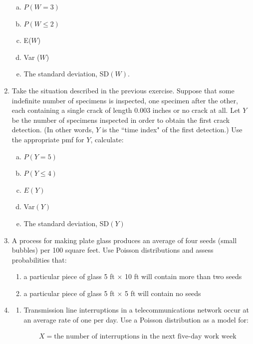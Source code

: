 \documentclass{article}\usepackage{graphicx, color}
\numberwithin{equation}{section}
\begin{document}
\begin{flushleft}
\begin{enumerate}[1. ]
\begin{enumerate}[a. ]
\item $P(W = 3)$
\item $P(W \le 2)$
\item E($W$)
\item Var ($W$)
\item The standard deviation, SD$(W)$.
\end{enumerate}





\item 
Take the situation described in the previous exercise. Suppose that some indefinite number of specimens is inspected, one specimen after the other, each containing a single crack of length 0.003 inches or no crack at all. Let $Y$ be the number of specimens inspected in order to obtain the first crack detection. (In other words, $Y$ is the ``time index" of the first detection.) Use the appropriate pmf for $Y$, calculate:
\begin{enumerate}[a. ]
\item $P(Y = 5)$
\item $P(Y \le 4)$
\item $E(Y)$
\item Var$(Y)$
\item The standard deviation, SD$(Y)$
\end{enumerate}



\item A process for making plate glass produces an average of four seeds (small bubbles) per 100 square feet. Use Poisson distributions and assess probabilities that:

\begin{enumerate}
\item a particular piece of glass 5 ft $\times$ 10 ft will contain more than two seeds
\item a particular piece of glass 5 ft $\times$ 5 ft will contain no seeds
\end{enumerate}






\item \begin{enumerate}
\item 
Transmission line interruptions in a telecommunications network occur at an average rate of one per day. Use a Poisson distribution as a model for:

\begin{align*}
X = \text{the number of interruptions in the next five-day work week}
\end{align*}


\end{enumerate}
\end{enumerate}
\end{flushleft}
\end{document}
